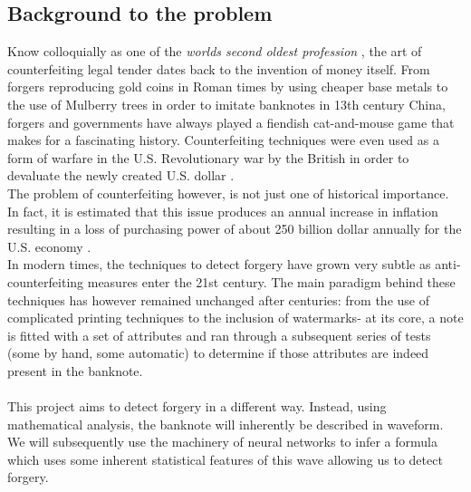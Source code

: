 \documentclass[14pt]{article}
\theoremstyle{plain}
\theoremstyle{definition}
\begin{document}
\subsection{Background to the problem}
Know colloquially as one of the \emph{worlds second oldest profession} \cite{wikiprof}, the art of counterfeiting legal tender dates back to the invention of money itself. From forgers reproducing gold coins in Roman times by using cheaper base metals \cite{wikiforge} to the use of Mulberry trees \cite{wikiforge} in order to imitate banknotes in 13th century China, forgers and governments have always played a fiendish cat-and-mouse game that makes for a fascinating history. Counterfeiting techniques were even used as a form of warfare in the U.S. Revolutionary war by the British in order to devaluate the newly created U.S. dollar \cite{wikiforge}.\\
The problem of counterfeiting however, is not just one of historical importance. In fact, it is estimated that this issue produces an annual increase in inflation resulting in a loss of purchasing power of about  250 billion dollar annually for the U.S. economy \cite{usforge}.\\ 
In  modern times, the techniques to detect forgery have grown very subtle as anti-counterfeiting measures enter the 21st century. The main paradigm behind these techniques has however remained unchanged after centuries: from the use of complicated printing techniques to the inclusion of watermarks- at its core, a note is fitted with a set of attributes and ran through a subsequent series of tests (some by hand, some automatic) to determine if those attributes are indeed present in the banknote.\\ \\This project aims to detect forgery in a different way. Instead, using mathematical analysis, the banknote will inherently be described in waveform. We will subsequently use the machinery of neural networks to infer a formula which uses some inherent statistical features of this wave allowing us to detect forgery.
\end{document}
